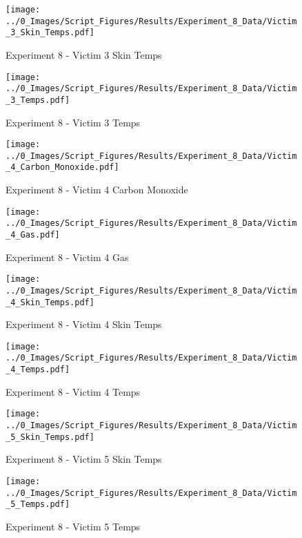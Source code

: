 	\clearpage

	\begin{figure}[H]
		\centering
		\texttt{[image: ../0\_Images/Script\_Figures/Results/Experiment\_8\_Data/Victim\_3\_Skin\_Temps.pdf]}
		\caption[]{Experiment 8 - Victim 3 Skin Temps}
	\end{figure}
 

	\begin{figure}[H]
		\centering
		\texttt{[image: ../0\_Images/Script\_Figures/Results/Experiment\_8\_Data/Victim\_3\_Temps.pdf]}
		\caption[]{Experiment 8 - Victim 3 Temps}
	\end{figure}
 
	\clearpage

	\begin{figure}[H]
		\centering
		\texttt{[image: ../0\_Images/Script\_Figures/Results/Experiment\_8\_Data/Victim\_4\_Carbon\_Monoxide.pdf]}
		\caption[]{Experiment 8 - Victim 4 Carbon Monoxide}
	\end{figure}
 

	\begin{figure}[H]
		\centering
		\texttt{[image: ../0\_Images/Script\_Figures/Results/Experiment\_8\_Data/Victim\_4\_Gas.pdf]}
		\caption[]{Experiment 8 - Victim 4 Gas}
	\end{figure}
 
	\clearpage

	\begin{figure}[H]
		\centering
		\texttt{[image: ../0\_Images/Script\_Figures/Results/Experiment\_8\_Data/Victim\_4\_Skin\_Temps.pdf]}
		\caption[]{Experiment 8 - Victim 4 Skin Temps}
	\end{figure}
 

	\begin{figure}[H]
		\centering
		\texttt{[image: ../0\_Images/Script\_Figures/Results/Experiment\_8\_Data/Victim\_4\_Temps.pdf]}
		\caption[]{Experiment 8 - Victim 4 Temps}
	\end{figure}
 
	\clearpage

	\begin{figure}[H]
		\centering
		\texttt{[image: ../0\_Images/Script\_Figures/Results/Experiment\_8\_Data/Victim\_5\_Skin\_Temps.pdf]}
		\caption[]{Experiment 8 - Victim 5 Skin Temps}
	\end{figure}
 

	\begin{figure}[H]
		\centering
		\texttt{[image: ../0\_Images/Script\_Figures/Results/Experiment\_8\_Data/Victim\_5\_Temps.pdf]}
		\caption[]{Experiment 8 - Victim 5 Temps}
	\end{figure}
 
